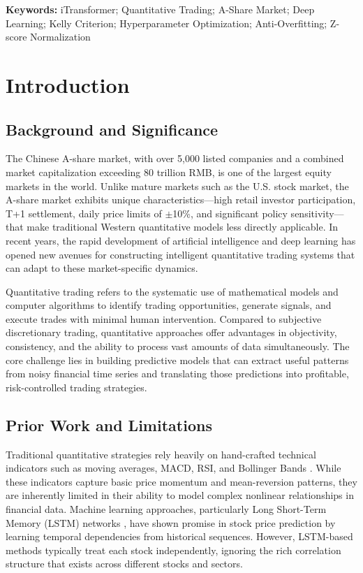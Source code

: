 \documentclass[12pt, a4paper]{article}
\begin{document}
\textbf{Keywords:} iTransformer; Quantitative Trading; A-Share Market; Deep Learning; Kelly Criterion; Hyperparameter Optimization; Anti-Overfitting; Z-score Normalization

\newpage
\tableofcontents
\newpage

\section{Introduction}

\subsection{Background and Significance}

The Chinese A-share market, with over 5,000 listed companies and a combined market capitalization exceeding 80 trillion RMB, is one of the largest equity markets in the world. Unlike mature markets such as the U.S. stock market, the A-share market exhibits unique characteristics---high retail investor participation, T+1 settlement, daily price limits of $\pm$10\%, and significant policy sensitivity---that make traditional Western quantitative models less directly applicable. In recent years, the rapid development of artificial intelligence and deep learning has opened new avenues for constructing intelligent quantitative trading systems that can adapt to these market-specific dynamics.

Quantitative trading refers to the systematic use of mathematical models and computer algorithms to identify trading opportunities, generate signals, and execute trades with minimal human intervention. Compared to subjective discretionary trading, quantitative approaches offer advantages in objectivity, consistency, and the ability to process vast amounts of data simultaneously. The core challenge lies in building predictive models that can extract useful patterns from noisy financial time series and translating those predictions into profitable, risk-controlled trading strategies.

\subsection{Prior Work and Limitations}

Traditional quantitative strategies rely heavily on hand-crafted technical indicators such as moving averages, MACD, RSI, and Bollinger Bands \citep{murphy1999technical}. While these indicators capture basic price momentum and mean-reversion patterns, they are inherently limited in their ability to model complex nonlinear relationships in financial data. Machine learning approaches, particularly Long Short-Term Memory (LSTM) networks \citep{hochreiter1997lstm, fischer2018deep}, have shown promise in stock price prediction by learning temporal dependencies from historical sequences. However, LSTM-based methods typically treat each stock independently, ignoring the rich correlation structure that exists across different stocks and sectors.
\end{document}
